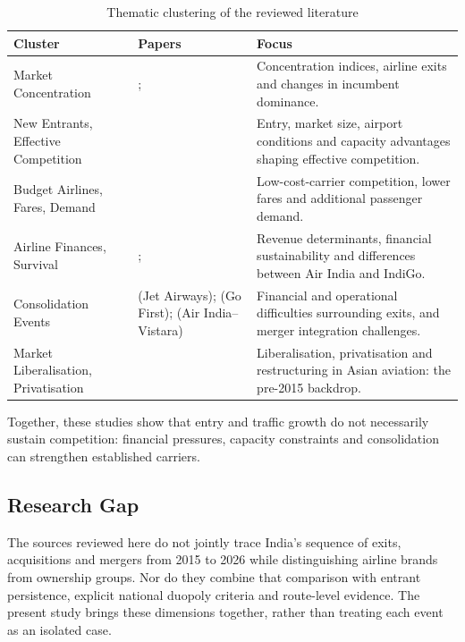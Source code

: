 \documentclass[12pt,a4paper]{article}
\begin{document}
\begin{table}[H]
\centering
\caption{Thematic clustering of the reviewed literature}\label{tab:lit-clusters}
\small
\begin{tabularx}{\textwidth}{|>{\raggedright\arraybackslash}p{}|>{\raggedright\arraybackslash}X|>{\raggedright\arraybackslash}X|}
\hline
\textbf{Cluster} & \textbf{Papers} & \textbf{Focus} \\
\hline
Market Concentration & \textcite{kumari2026soaring}; \textcite{grosche2020concentration} & Concentration indices, airline exits and changes in incumbent dominance. \\
\hline
New Entrants, Effective Competition & \textcite{oliveira2018effective} & Entry, market size, airport conditions and capacity advantages shaping effective competition. \\
\hline
Budget Airlines, Fares, Demand & \textcite{wang2018determinants} & Low-cost-carrier competition, lower fares and additional passenger demand. \\
\hline
Airline Finances, Survival & \textcite{jayathilakan2024determinants}; \textcite{ali2019impact} & Revenue determinants, financial sustainability and differences between Air India and IndiGo. \\
\hline
Consolidation Events & \textcite{soman2024jet} (Jet Airways); \textcite{jasrotia2025gofirst} (Go First); \textcite{chaudhary2023airindia} (Air India--Vistara) & Financial and operational difficulties surrounding exits, and merger integration challenges. \\
\hline
Market Liberalisation, Privatisation & \textcite{findlay2004liberalization} & Liberalisation, privatisation and restructuring in Asian aviation: the pre-2015 backdrop. \\
\hline
\end{tabularx}
\end{table}

Together, these studies show that entry and traffic growth do not necessarily sustain competition: financial pressures, capacity constraints and consolidation can strengthen established carriers.

\subsection{Research Gap}
The sources reviewed here do not jointly trace India's sequence of exits, acquisitions and mergers from 2015 to 2026 while distinguishing airline brands from ownership groups. Nor do they combine that comparison with entrant persistence, explicit national duopoly criteria and route-level evidence. The present study brings these dimensions together, rather than treating each event as an isolated case.
\end{document}
